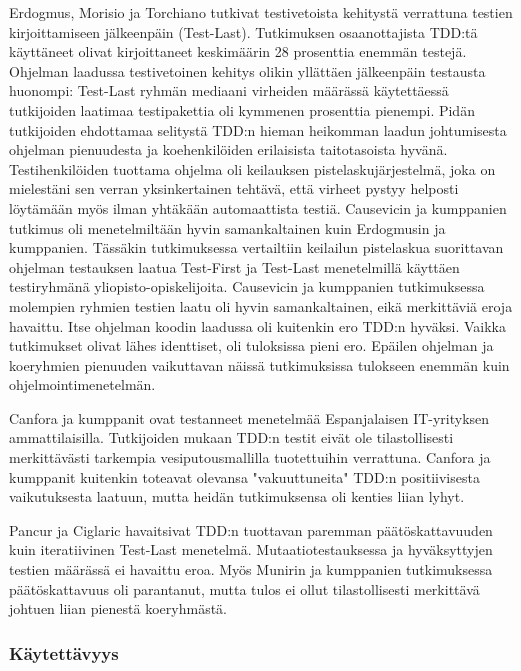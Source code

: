 \documentclass[finnish]{tktltiki2}
\theoremstyle{definition}
\theoremstyle{remark}
\begin{document}
Erdogmus, Morisio ja Torchiano \cite{Erdogmus05} tutkivat testivetoista kehitystä verrattuna testien kirjoittamiseen jälkeenpäin (Test-Last). Tutkimuksen osaanottajista TDD:tä käyttäneet olivat kirjoittaneet keskimäärin 28 prosenttia enemmän testejä. Ohjelman laadussa testivetoinen kehitys olikin yllättäen jälkeenpäin testausta huonompi: Test-Last ryhmän mediaani virheiden määrässä käytettäessä tutkijoiden laatimaa testipakettia oli kymmenen prosenttia pienempi. Pidän tutkijoiden ehdottamaa selitystä TDD:n hieman heikomman laadun johtumisesta ohjelman pienuudesta ja koehenkilöiden erilaisista taitotasoista hyvänä. Testihenkilöiden tuottama ohjelma oli keilauksen pistelaskujärjestelmä, joka on mielestäni sen verran yksinkertainen tehtävä, että virheet pystyy helposti löytämään myös ilman yhtäkään automaattista testiä. Causevicin ja kumppanien \cite{Causevic12} tutkimus oli menetelmiltään hyvin samankaltainen kuin Erdogmusin ja kumppanien. Tässäkin tutkimuksessa vertailtiin keilailun pistelaskua suorittavan ohjelman testauksen laatua Test-First ja Test-Last menetelmillä käyttäen testiryhmänä yliopisto-opiskelijoita. Causevicin ja kumppanien tutkimuksessa molempien ryhmien testien laatu oli hyvin samankaltainen, eikä merkittäviä eroja havaittu. Itse ohjelman koodin laadussa oli kuitenkin ero TDD:n hyväksi. Vaikka tutkimukset olivat lähes identtiset,  oli tuloksissa pieni ero. Epäilen ohjelman ja koeryhmien pienuuden vaikuttavan näissä tutkimuksissa tulokseen enemmän kuin ohjelmointimenetelmän.

 Canfora ja kumppanit \cite{Canfora06} ovat testanneet menetelmää Espanjalaisen IT-yrityksen ammattilaisilla. Tutkijoiden mukaan TDD:n testit eivät ole tilastollisesti merkittävästi tarkempia vesiputousmallilla tuotettuihin verrattuna. Canfora ja kumppanit kuitenkin toteavat olevansa "vakuuttuneita" TDD:n positiivisesta vaikutuksesta laatuun, mutta heidän tutkimuksensa oli kenties liian lyhyt.

Pancur ja Ciglaric \cite{Pancur11} havaitsivat TDD:n tuottavan paremman päätöskattavuuden kuin iteratiivinen Test-Last menetelmä. Mutaatiotestauksessa ja hyväksyttyjen testien määrässä ei havaittu eroa. Myös Munirin ja kumppanien \cite{Munir14} tutkimuksessa päätöskattavuus oli parantanut, mutta tulos ei ollut tilastollisesti merkittävä johtuen liian pienestä koeryhmästä.

\subsubsection{Käytettävyys}
\end{document}
